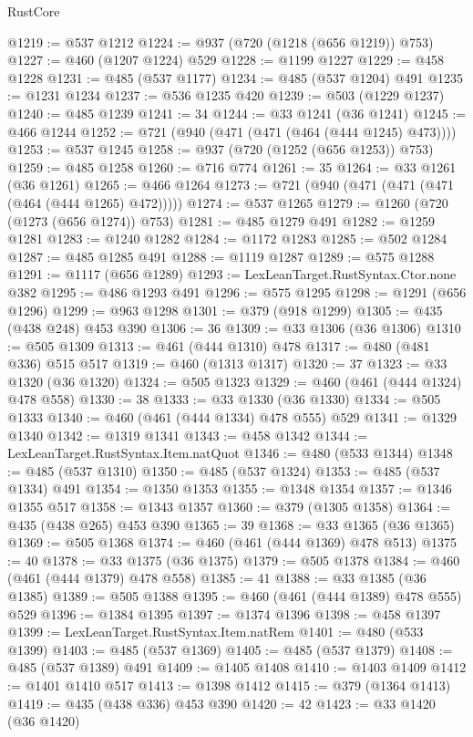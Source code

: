 \begin{lexlean}{RustCore}
\begin{coremodule}
@1219 := @537 @1212
@1224 := @937 (@720 (@1218 (@656 @1219)) @753)
@1227 := @460 (@1207 @1224) @529
@1228 := @1199 @1227
@1229 := @458 @1228
@1231 := @485 (@537 @1177)
@1234 := @485 (@537 @1204) @491
@1235 := @1231 @1234
@1237 := @536 @1235 @420
@1239 := @503 (@1229 @1237)
@1240 := @485 @1239
@1241 := 34
@1244 := @33 @1241 (@36 @1241)
@1245 := @466 @1244
@1252 := @721 (@940 (@471 (@471 (@464 (@444 @1245) @473))))
@1253 := @537 @1245
@1258 := @937 (@720 (@1252 (@656 @1253)) @753)
@1259 := @485 @1258
@1260 := @716 @774
@1261 := 35
@1264 := @33 @1261 (@36 @1261)
@1265 := @466 @1264
@1273 := @721 (@940 (@471 (@471 (@471 (@464 (@444 @1265) @472)))))
@1274 := @537 @1265
@1279 := @1260 (@720 (@1273 (@656 @1274)) @753)
@1281 := @485 @1279 @491
@1282 := @1259 @1281
@1283 := @1240 @1282
@1284 := @1172 @1283
@1285 := @502 @1284
@1287 := @485 @1285 @491
@1288 := @1119 @1287
@1289 := @575 @1288
@1291 := @1117 (@656 @1289)
@1293 := LexLeanTarget.RustSyntax.Ctor.none @382
@1295 := @486 @1293 @491
@1296 := @575 @1295
@1298 := @1291 (@656 @1296)
@1299 := @963 @1298
@1301 := @379 (@918 @1299)
@1305 := @435 (@438 @248) @453 @390
@1306 := 36
@1309 := @33 @1306 (@36 @1306)
@1310 := @505 @1309
@1313 := @461 (@444 @1310) @478
@1317 := @480 (@481 @336) @515 @517
@1319 := @460 (@1313 @1317)
@1320 := 37
@1323 := @33 @1320 (@36 @1320)
@1324 := @505 @1323
@1329 := @460 (@461 (@444 @1324) @478 @558)
@1330 := 38
@1333 := @33 @1330 (@36 @1330)
@1334 := @505 @1333
@1340 := @460 (@461 (@444 @1334) @478 @555) @529
@1341 := @1329 @1340
@1342 := @1319 @1341
@1343 := @458 @1342
@1344 := LexLeanTarget.RustSyntax.Item.natQuot
@1346 := @480 (@533 @1344)
@1348 := @485 (@537 @1310)
@1350 := @485 (@537 @1324)
@1353 := @485 (@537 @1334) @491
@1354 := @1350 @1353
@1355 := @1348 @1354
@1357 := @1346 @1355 @517
@1358 := @1343 @1357
@1360 := @379 (@1305 @1358)
@1364 := @435 (@438 @265) @453 @390
@1365 := 39
@1368 := @33 @1365 (@36 @1365)
@1369 := @505 @1368
@1374 := @460 (@461 (@444 @1369) @478 @513)
@1375 := 40
@1378 := @33 @1375 (@36 @1375)
@1379 := @505 @1378
@1384 := @460 (@461 (@444 @1379) @478 @558)
@1385 := 41
@1388 := @33 @1385 (@36 @1385)
@1389 := @505 @1388
@1395 := @460 (@461 (@444 @1389) @478 @555) @529
@1396 := @1384 @1395
@1397 := @1374 @1396
@1398 := @458 @1397
@1399 := LexLeanTarget.RustSyntax.Item.natRem
@1401 := @480 (@533 @1399)
@1403 := @485 (@537 @1369)
@1405 := @485 (@537 @1379)
@1408 := @485 (@537 @1389) @491
@1409 := @1405 @1408
@1410 := @1403 @1409
@1412 := @1401 @1410 @517
@1413 := @1398 @1412
@1415 := @379 (@1364 @1413)
@1419 := @435 (@438 @336) @453 @390
@1420 := 42
@1423 := @33 @1420 (@36 @1420)

\end{coremodule}
\end{lexlean}
